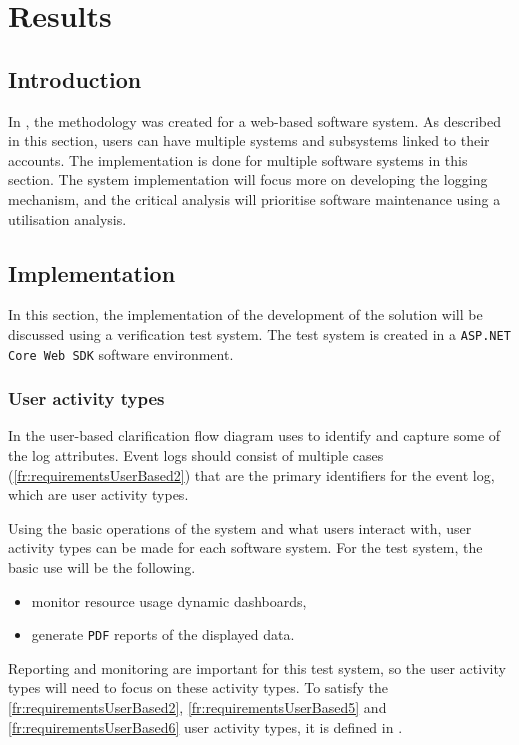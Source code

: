 \chapter{Results}
\label{chap:3}

\section{Introduction}
In , the methodology was created for a web-based software system. As described in this section, users can have multiple systems and subsystems linked to their accounts. The implementation is done for multiple software systems in this section. The system implementation will focus more on developing the logging mechanism, and the critical analysis will prioritise software maintenance using a utilisation analysis.

\section{Implementation}\label{sec:ch3_implementation}
In this section, the implementation of the development of the solution will be discussed using a verification test system. The test system is created in a \texttt{ASP.NET Core Web SDK} software environment.

\subsection{User activity types}
In  the user-based clarification flow diagram uses  to identify and capture some of the log attributes. Event logs should consist of multiple cases (\ref{fr:requirementsUserBased2}) that are the primary identifiers for the event log, which are user activity types.\par Using the basic operations of the system and what users interact with, user activity types can be made for each software system. For the test system, the basic use will be the following.

\begin{itemize}
	\item monitor resource usage dynamic dashboards,
	\item generate \texttt{PDF} reports of the displayed data.
\end{itemize}

Reporting and monitoring are important for this test system, so the user activity types will need to focus on these activity types. To satisfy the \ref{fr:requirementsUserBased2}, \ref{fr:requirementsUserBased5} and \ref{fr:requirementsUserBased6} user activity types, it is defined in .

